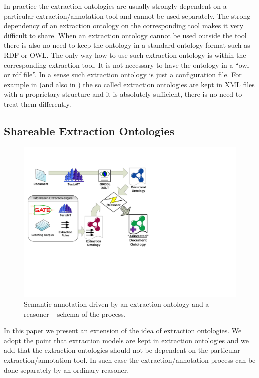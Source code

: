 In practice the extraction ontologies are usually strongly dependent on a particular extraction/annotation tool and cannot be used separately. The strong dependency of an extraction ontology on the corresponding tool makes it very difficult to share. When an extraction ontology cannot be used outside the tool there is also no need to keep the ontology in a standard ontology format such as RDF or OWL. The only way how to use such extraction ontology is within the corresponding extraction tool. It is not necessary to have the ontology in a ``owl or rdf file''. In a sense such extraction ontology is just a configuration file. For example in \citep{springerlink:10.1007/978-3-642-01891-6_5} %
 (and also in \citep{DBLP:conf/er/EmbleyTL02}) the so called extraction ontologies are kept in XML files with a proprietary structure and it is absolutely sufficient, there is no need to treat them differently.



\subsection{Shareable Extraction Ontologies}



\begin{figure}
\centerline{\includegraphics[angle=-90, width=0.7\hsize]{semantic_rules_app_schema}}
\caption{Semantic annotation driven by an extraction ontology and a reasoner -- schema of the process.}
\label{img:rules_app_schema}
\end{figure}


In this paper we present an extension of the idea of extraction ontologies. We adopt the point that extraction models are kept in extraction ontologies and we add that the extraction ontologies should not be dependent on the particular extraction/annotation tool. In such case the extraction/annotation process can be done separately by an ordinary reasoner.


